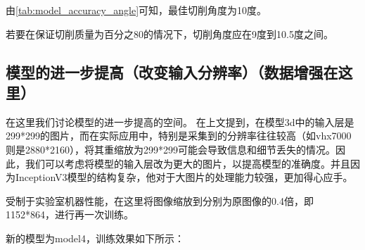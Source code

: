    由\autoref{tab:model_accuracy_angle}可知，最佳切削角度为10度。

    若要在保证切削质量为百分之80的情况下，切削角度应在9度到10.5度之间。


\subsection{模型的进一步提高（改变输入分辨率）（数据增强在这里）}

在这里我们讨论模型的进一步提高的空间。
在上文提到，在模型3d中的输入层是299*299的图片，而在实际应用中，特别是采集到的分辨率往往较高（如vhx7000则是2880*2160），将其重缩放为299*299可能会导致信息和细节丢失的情况。因此，我们可以考虑将模型的输入层改为更大的图片，以提高模型的准确度。并且因为InceptionV3模型的结构复杂，他对于大图片的处理能力较强，更加得心应手。

受制于实验室机器性能，在这里将图像缩放到分别为原图像的0.4倍，即1152*864，进行再一次训练。

新的模型为model4，训练效果如下所示：


